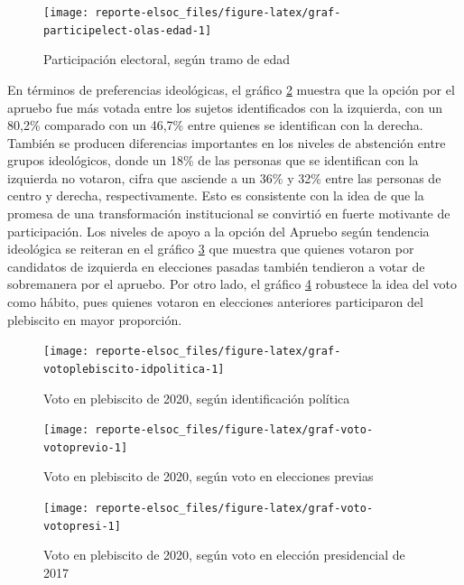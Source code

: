 \documentclass[
  12pt,
]{book}
\begin{document}
\begin{figure}

{\centering \texttt{[image: reporte-elsoc\_files/figure-latex/graf-participelect-olas-edad-1]} 

}

\caption{Participación electoral, según tramo de edad}\label{fig:graf-participelect-olas-edad}
\end{figure}

En términos de preferencias ideológicas, el gráfico \ref{fig:graf-votoplebiscito-idpolitica} muestra que la opción por el apruebo fue más votada entre los sujetos identificados con la izquierda, con un 80,2\% comparado con un 46,7\% entre quienes se identifican con la derecha. También se producen diferencias importantes en los niveles de abstención entre grupos ideológicos, donde un 18\% de las personas que se identifican con la izquierda no votaron, cifra que asciende a un 36\% y 32\% entre las personas de centro y derecha, respectivamente. Esto es consistente con la idea de que la promesa de una transformación institucional se convirtió en fuerte motivante de participación. Los niveles de apoyo a la opción del Apruebo según tendencia ideológica se reiteran en el gráfico \ref{fig:graf-voto-votoprevio} que muestra que quienes votaron por candidatos de izquierda en elecciones pasadas también tendieron a votar de sobremanera por el apruebo. Por otro lado, el gráfico \ref{fig:graf-voto-votopresi} robustece la idea del voto como hábito, pues quienes votaron en elecciones anteriores participaron del plebiscito en mayor proporción.

\begin{figure}

{\centering \texttt{[image: reporte-elsoc\_files/figure-latex/graf-votoplebiscito-idpolitica-1]} 

}

\caption{Voto en plebiscito de 2020, según identificación política}\label{fig:graf-votoplebiscito-idpolitica}
\end{figure}

\begin{figure}

{\centering \texttt{[image: reporte-elsoc\_files/figure-latex/graf-voto-votoprevio-1]} 

}

\caption{Voto en plebiscito de 2020, según voto en elecciones previas}\label{fig:graf-voto-votoprevio}
\end{figure}

\begin{figure}

{\centering \texttt{[image: reporte-elsoc\_files/figure-latex/graf-voto-votopresi-1]} 

}

\caption{Voto en plebiscito de 2020, según voto en elección presidencial de 2017}\label{fig:graf-voto-votopresi}
\end{figure}
\end{document}
